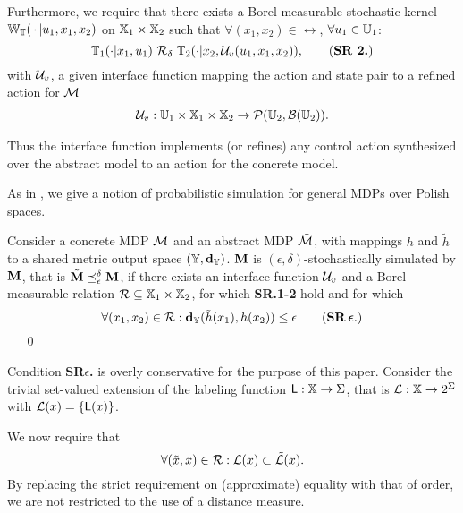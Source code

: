 \documentclass{ifacconf}
\begin{document}
Furthermore, we require that there exists a Borel measurable stochastic kernel $\mathbb{W}_{\mathbb{T}}(\,\cdot\,{\mid} u_1,x_1,x_2)$ on ${\mathbb{X}}_1\times{\mathbb{X}}_2$ such that $\forall (x_1,x_2)\in \rel$, $\forall u_1\in{\mathbb{U}}_1$:
\begin{equation}\mathbb T_1(\cdot| x_1, u_1)\ \bar \rel_\delta \  \mathbb T_2(\cdot| x_2, \InF(u_1,x_1,x_2)),\tag{\textbf{SR 2.}}\end{equation} with $\mathcal{U}_{v}$, a given interface function mapping the action and state pair to a refined action for $\mathcal{M}$
\begin{align*}\mathcal{U}_{v}: {\mathbb{U}}_1\times {\mathbb{X}}_1\times{\mathbb{X}}_2 \rightarrow \mathcal{P}({\mathbb{U}}_2,\mathcal B({\mathbb{U}}_2)). \end{align*}

Thus the interface function implements (or refines) any control action synthesized over the abstract model to an action for the concrete model.


As in \citep{haesaert2017verification},  we give a notion of probabilistic simulation for  general MDPs over Polish spaces.
%
\begin{definition}\label{def:apbsim}
Consider a concrete MDP $\mathcal{M}$ and an abstract  MDP $\tilde{\mathcal{M}}$, with mappings $h$ and  $\tilde h$  to a shared {metric} output space  $({\mathbb{Y}},\mathbf{d}_{\mathbb{Y}})$.   
	$\tilde{{\mathbf{M}}}$ is $(\epsilon,\delta)$-stochastically simulated by ${\mathbf{M}}$, that is $\tilde{{\mathbf{M}}}\preceq^{\delta}_\epsilon{\mathbf{M}}$,  if there exists an interface function $\mathcal{U}_{v}$ and
	a Borel measurable relation $\mathcal{R}\subseteq {\mathbb{X}}_1\times {\mathbb{X}}_2$, for which \textbf{SR.1-2} hold and for which 
	\begin{equation}
		\forall (x_1,x_2)\in \rel:\mathbf{d}_\Y(\tilde h(x_1),h(x_2))  \leq \epsilon\tag{\textbf{SR\,$\boldsymbol{\epsilon}$}.}
	\end{equation} 
\mbox{ }	\hfill\mbox{ }\qed
\end{definition}
Condition \textbf{SR$\epsilon$.} is overly conservative for the purpose of this paper. 
Consider the trivial set-valued extension of  the labeling function $\mathsf{L}:{\mathbb{X}}\rightarrow\Sigma$, that is  $\mathcal{L}:{\mathbb{X}}\rightarrow2^\Sigma$ with
 $\mathcal{L}(x)=\{\mathsf{L}(x)\}$.
 
We now require that \begin{equation}
  \forall (\tilde x,x )\in \mathcal{R}:  \mathcal{L}(x)\subset \tilde{\mathcal{L}}(x).
  \end{equation} 
By replacing the strict requirement on (approximate) equality with that of order,   we are not restricted to the use of a distance measure. %
 
\end{document}
